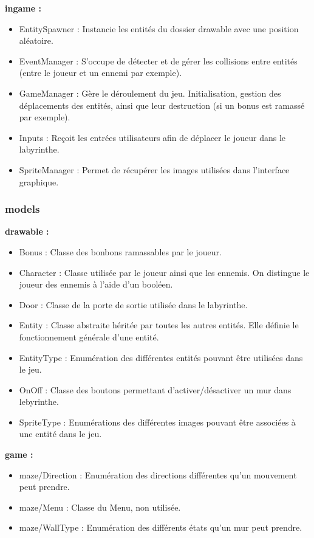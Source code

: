 \documentclass[a4paper]{article}
\begin{document}
\textbf{ingame :} \begin{itemize}
	\item{EntitySpawner : Instancie les entités du dossier drawable
	avec une position aléatoire.}
	\item{EventManager : S'occupe de détecter et de gérer les collisions entre
	entités (entre le joueur et un ennemi par exemple).}
	\item{GameManager : Gère le déroulement du jeu. Initialisation, gestion des
	déplacements des entités, ainsi que leur destruction (si un bonus est
	ramassé par exemple).}
	\item{Inputs : Reçoit les entrées utilisateurs afin de déplacer le joueur
	dans le labyrinthe.}
	\item{SpriteManager : Permet de récupérer les images utilisées dans
	l'interface graphique.}
\end{itemize}

\subsubsection{models}
\textbf{drawable :} \begin{itemize}
	\item{Bonus : Classe des bonbons ramassables par le joueur.}
	\item{Character : Classe utilisée par le joueur ainsi que les ennemis. On
	distingue le joueur des ennemis à l'aide d'un booléen.}
	\item{Door : Classe de la porte de sortie utilisée dans le labyrinthe.}
	\item{Entity : Classe abstraite héritée par toutes les autres entités. Elle
	définie le fonctionnement générale d'une entité.}
	\item{EntityType : Enumération des différentes entités pouvant être
	utilisées dans le jeu.}
	\item{OnOff : Classe des boutons permettant d'activer/désactiver un mur dans
	lebyrinthe.}
	\item{SpriteType : Enumérations des différentes images pouvant être
	associées à une entité dans le jeu.}
\end{itemize}

\textbf{game :} \begin{itemize}
	\item{maze/Direction : Enumération des directions différentes qu'un
	mouvement peut prendre.}
	\item{maze/Menu : Classe du Menu, non utilisée.}
	\item{maze/WallType : Enumération des différents états qu'un mur peut
	prendre.}
\end{itemize}
\end{document}
